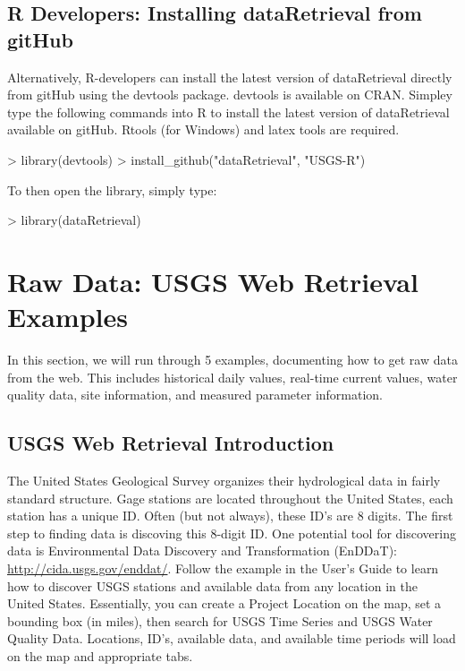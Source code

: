 \documentclass[a4paper,11pt]{article}
\begin{document}
\subsection{R Developers: Installing dataRetrieval from gitHub}
Alternatively, R-developers can install the latest version of dataRetrieval directly from gitHub using the devtools package.  devtools is available on CRAN.  Simpley type the following commands into R to install the latest version of dataRetrieval available on gitHub.  Rtools (for Windows) and latex tools are required.

\begin{Schunk}
\begin{Sinput}
> library(devtools)
> install_github("dataRetrieval", "USGS-R")
\end{Sinput}
\end{Schunk}
To then open the library, simply type:

\begin{Schunk}
\begin{Sinput}
> library(dataRetrieval)
\end{Sinput}
\end{Schunk}

\newpage
\section{Raw Data: USGS Web Retrieval Examples}
In this section, we will run through 5 examples, documenting how to get raw data from the web. This includes historical daily values, real-time current values, water quality data, site information, and measured parameter information. 
\subsection{USGS Web Retrieval Introduction}
The United States Geological Survey organizes their hydrological data in fairly standard structure.  Gage stations are located throughout the United States, each station has a unique ID.  Often (but not always), these ID's are 8 digits.  The first step to finding data is discoving this 8-digit ID. One potential tool for discovering data is Environmental Data Discovery and Transformation (EnDDaT): \url{http://cida.usgs.gov/enddat/}.  Follow the example in the User's Guide to learn how to discover USGS stations and available data from any location in the United States. Essentially, you can create a Project Location on the map, set a bounding box (in miles), then search for USGS Time Series and USGS Water Quality Data. Locations, ID's, available data, and available time periods will load on the map and appropriate tabs.
\end{document}
